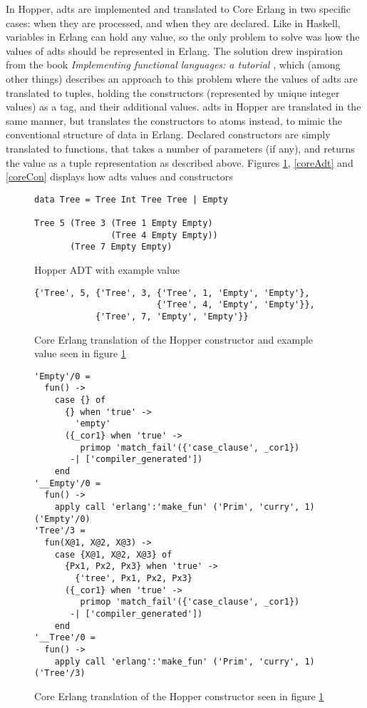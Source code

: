 In Hopper, \glspl{adt} are implemented and translated to Core Erlang in two specific cases: when they are processed, and when they are declared. Like in Haskell, variables in Erlang can
hold any value, so the only problem to solve was how the values of \glspl{adt} should be represented in Erlang. The solution drew inspiration from the book \textit{Implementing functional languages: a tutorial} \cite{FunTutorial}, which (among other things) describes an approach to this problem where the values of \glspl{adt} are translated to tuples, holding the constructors (represented by unique integer values) as a tag, and their additional values. \Glspl{adt} in Hopper are translated in the same manner, but translates the constructors to atoms instead, to mimic the conventional structure of data in Erlang. Declared constructors are simply translated to functions, that takes a number of parameters (if any), and returns the value as a tuple representation as described above. Figures \ref{lst:hopperAdt}, \ref{coreAdt} and \ref{coreCon} displays how \glspl{adt} values and constructors 

\begin{figure}[!htb]
\centering
\begin{lstlisting} 
data Tree = Tree Int Tree Tree | Empty

Tree 5 (Tree 3 (Tree 1 Empty Empty) 
               (Tree 4 Empty Empty)) 
       (Tree 7 Empty Empty)
\end{lstlisting}
\caption{Hopper ADT with example value}
\label{lst:hopperAdt}
\end{figure}

\begin{figure}[!htb]
\centering
\begin{lstlisting} 
{'Tree', 5, {'Tree', 3, {'Tree', 1, 'Empty', 'Empty'},
                        {'Tree', 4, 'Empty', 'Empty'}},
            {'Tree', 7, 'Empty', 'Empty'}}
\end{lstlisting}
\caption[Core Erlang translation of constructor and example value]
 {Core Erlang translation of the Hopper constructor and example value seen in figure \ref{lst:hopperAdt}}
\label{lst:coreAdt}
\end{figure}

\begin{figure}[!htb]
\centering
\begin{lstlisting}
'Empty'/0 =
  fun() ->
    case {} of
      {} when 'true' ->
        'empty'
      ({_cor1} when 'true' ->
         primop 'match_fail'({'case_clause', _cor1})
       -| ['compiler_generated'])
    end
'__Empty'/0 =
  fun() ->
    apply call 'erlang':'make_fun' ('Prim', 'curry', 1)('Empty'/0)
'Tree'/3 =
  fun(X@1, X@2, X@3) ->
    case {X@1, X@2, X@3} of
      {Px1, Px2, Px3} when 'true' ->
        {'tree', Px1, Px2, Px3}
      ({_cor1} when 'true' ->
         primop 'match_fail'({'case_clause', _cor1})
       -| ['compiler_generated'])
    end
'__Tree'/0 =
  fun() ->
    apply call 'erlang':'make_fun' ('Prim', 'curry', 1)('Tree'/3)
\end{lstlisting}
\caption[Generated Core Erlang translation of constructor]
 {Core Erlang translation of the Hopper constructor seen in figure \ref{lst:hopperAdt}}
\label{lst:coreCon}
\end{figure}

